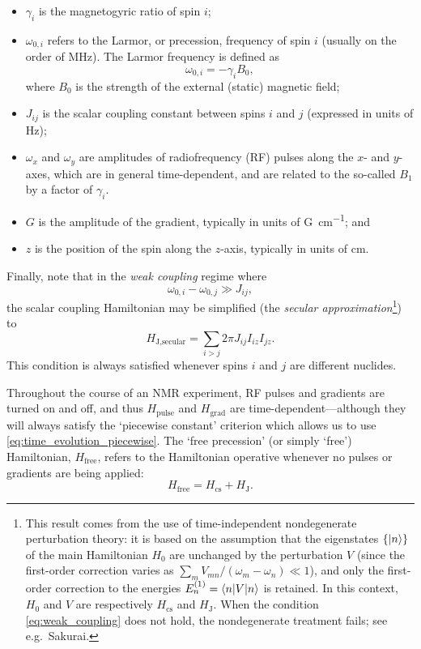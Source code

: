 \begin{itemize}
    \item $\gamma_i$ is the magnetogyric ratio of spin $i$;
    \item $\omega_{0,i}$ refers to the Larmor, or precession, frequency of spin $i$ (usually on the order of \unit{MHz}). The Larmor frequency is defined as
        \begin{equation}
            \label{eq:larmor_frequency}
            \omega_{0,i} = -\gamma_i B_0,
        \end{equation}
        where $B_0$ is the strength of the external (static) magnetic field;
    \item $J_{ij}$ is the scalar coupling constant between spins $i$ and $j$ (expressed in units of \unit{Hz});
    \item $\omega_x$ and $\omega_y$ are amplitudes of radiofrequency (RF) pulses along the $x$- and $y$-axes, which are in general time-dependent, and are related to the so-called $B_1$ by a factor of $\gamma_i$.
    \item $G$ is the amplitude of the gradient, typically in units of \unit{G\per\cm}; and
    \item $z$ is the position of the spin along the $z$-axis, typically in units of \unit{\cm}.
\end{itemize}

Finally, note that in the \textit{weak coupling} regime where
\begin{equation}
    \omega_{0,i} - \omega_{0,j} \gg J_{ij}, \label{eq:weak_coupling}
\end{equation}
the scalar coupling Hamiltonian may be simplified (the \textit{secular approximation}\footnote{This result comes from the use of time-independent nondegenerate perturbation theory: it is based on the assumption that the eigenstates $\{\ket{n}\}$ of the main Hamiltonian $H_0$ are unchanged by the perturbation $V$ (since the first-order correction varies as $\sum_m V_{mn}/(\omega_m - \omega_n) \ll 1$), and only the first-order correction to the energies $E_n^{(1)} = \braket{n | V | n}$ is retained. In this context, $H_0$ and $V$ are respectively $H_\text{cs}$ and $H_\text{J}$. When the condition \cref{eq:weak_coupling} does not hold, the nondegenerate treatment fails; see e.g.\ Sakurai\autocite{Sakurai2021}.}) to
\begin{equation}
    H_\text{J,secular} = \sum_{i > j} 2\pi J_{ij} I_{iz}I_{jz} \label{eq:h_j_secular}.
\end{equation}
This condition is always satisfied whenever spins $i$ and $j$ are different nuclides.

Throughout the course of an NMR experiment, RF pulses and gradients are turned on and off, and thus $H_\text{pulse}$ and $H_\text{grad}$ are time-dependent---although they will always satisfy the `piecewise constant' criterion which allows us to use \cref{eq:time_evolution_piecewise}.
The `free precession' (or simply `free') Hamiltonian, $H_\text{free}$, refers to the Hamiltonian operative whenever no pulses or gradients are being applied: 
\begin{equation}
    \label{eq:h_free}
    H_\text{free} = H_\text{cs} + H_\text{J}.
\end{equation}
